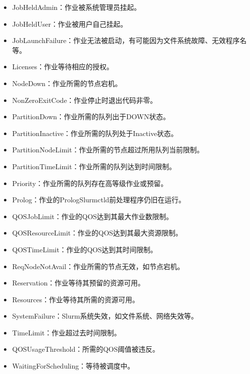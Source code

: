 \begin{itemize}
\begin{itemize}
    \item JobHeldAdmin：作业被系统管理员挂起。
    \item JobHeldUser：作业被用户自己挂起。
    \item JobLaunchFailure：作业无法被启动，有可能因为文件系统故障、无效程序名等。
    \item Licenses：作业等待相应的授权。
    \item NodeDown：作业所需的节点宕机。
    \item NonZeroExitCode：作业停止时退出代码非零。
    \item PartitionDown：作业所需的队列出于DOWN状态。
    \item PartitionInactive：作业所需的队列处于Inactive状态。
    \item PartitionNodeLimit：作业所需的节点超过所用队列当前限制。
    \item PartitionTimeLimit：作业所需的队列达到时间限制。
    \item Priority：作业所需的队列存在高等级作业或预留。
    \item Prolog：作业的PrologSlurmctld前处理程序仍旧在运行。
    \item QOSJobLimit：作业的QOS达到其最大作业数限制。
    \item QOSResourceLimit：作业的QOS达到其最大资源限制。
    \item QOSTimeLimit：作业的QOS达到其时间限制。
    \item ReqNodeNotAvail：作业所需的节点无效，如节点宕机。
    \item Reservation：作业等待其预留的资源可用。
    \item Resources：作业等待其所需的资源可用。
    \item SystemFailure：Slurm系统失效，如文件系统、网络失效等。
    \item TimeLimit：作业超过去时间限制。
    \item QOSUsageThreshold：所需的QOS阈值被违反。
    \item WaitingForScheduling：等待被调度中。
\end{itemize}
\end{itemize}

